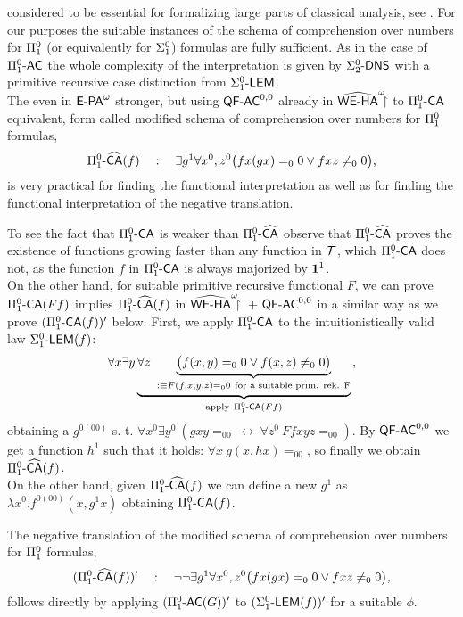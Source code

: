 considered to be essential for formalizing large
parts of classical analysis, see \cite{Simpson99}. 
For our purposes the suitable instances of the schema of comprehension over
numbers for $\Pi^0_1$ (or equivalently for $\Sigma^0_1$) formulas are fully sufficient.
As in the case of $\Pi^0_1\textsf{\upshape -}\textsf{\upshape AC}$ the whole complexity
of the interpretation is given by $\Sigma^0_2\textsf{\upshape -}\textsf{\upshape DNS}$ with a primitive recursive case distinction
from $\Sigma^0_1\textsf{\upshape -LEM}$.\\
The even in ${\textsf{\upshape E-PA}}^\omega$ stronger, but using $\textsf{\upshape QF}\textsf{\upshape -}\textsf{\upshape AC}^{0,0}$ already in $\widehat{\textsf{\upshape WE-HA}}^\omega\!\!\!\restriction$ to $\Pi^0_1\textsf{\upshape -}\textsf{\upshape CA}$ equivalent, form called 
modified schema of comprehension over numbers for $\Pi^0_1$ formulas,
\[
\Pi^0_1\textsf{\upshape -}\widehat{\textsf{\upshape CA}}(f)\quad:\quad\exists g^1 \forall x^0,z^0 \big(fx(gx)=_00 \vee fxz\neq_00\big)\text{,}
\]
is very practical for finding the functional interpretation as well as for finding
the functional interpretation of the negative translation.
\begin{rmk}
To see the fact that $\Pi^0_1\textsf{\upshape -}\textsf{\upshape CA}$ is weaker than $\Pi^0_1\textsf{\upshape -}\widehat{\textsf{\upshape CA}}$ observe that
$\Pi^0_1\textsf{\upshape -}\widehat{\textsf{\upshape CA}}$ proves the existence of functions growing faster than any function in $\mathcal{T}$, which
$\Pi^0_1\textsf{\upshape -}\textsf{\upshape CA}$ does not, as the function $f$ in $\Pi^0_1\textsf{\upshape -}\textsf{\upshape CA}$ is always majorized by $\mathbf1^1$.\\
On the other hand, for suitable primitive recursive functional $F$, we can prove $\Pi^0_1\textsf{\upshape -}\textsf{\upshape CA}(Ff)$ implies $\Pi^0_1\textsf{\upshape -}\widehat{\textsf{\upshape CA}}(f)$ in $\widehat{\textsf{\upshape WE-HA}}^\omega\!\!\!\restriction\ +\ \textsf{\upshape QF}\textsf{\upshape -}\textsf{\upshape AC}^{0,0}$
in a similar way as we prove $(\Pi^0_1\textsf{\upshape -}\textsf{\upshape CA}(f))'$ below.
First, we apply $\Pi^0_1\textsf{\upshape -}\textsf{\upshape CA}$ to the intuitionistically valid law $\Sigma^0_1\textsf{\upshape -LEM}(f)$:
\[
\forall x\exists y \underbrace{
                        \forall z\  \underbrace {\big(f(x,y)=_00 \vee f(x,z)\neq_00\big)}_{
                                                                                :\equiv F(f,x,y,z)=_00\ \text{for a suitable prim. rek. F} } }_{
                                                        \text{apply}\ \PiLm\CA(Ff) }
\text{,}
\]
obtaining a $g^{0(00)}$ s. t. $\forall x^0\exists y^0\ (gxy=_00\ \leftrightarrow\ \forall z^0\ Ffxyz=_00)$.
By $\textsf{\upshape QF}\textsf{\upshape -}\textsf{\upshape AC}^{0,0}$ we get a function $h^1$ such that it holds: $\forall x\ g(x,hx)=_00$, so finally we obtain $\Pi^0_1\textsf{\upshape -}\widehat{\textsf{\upshape CA}}(f)$.\\
On the other hand, given $\Pi^0_1\textsf{\upshape -}\widehat{\textsf{\upshape CA}}(f)$ we can define a new $g^1$ as $\lambda x^0.f^{0(00)}(x,g^1x)$ obtaining $\Pi^0_1\textsf{\upshape -}\textsf{\upshape CA}(f)$.
\end{rmk}
The negative translation of the modified schema of comprehension 
over numbers for $\Pi^0_1$ formulas,
\[
(\Pi^0_1\textsf{\upshape -}\widehat{\textsf{\upshape CA}}(f))'\quad:\quad
 \neg\neg \exists g^1 \forall x^0,z^0 \big(fx(gx)=_00 \vee fxz\neq_00\big)\text{,}
\]
follows directly by applying $(\Pi^0_1\textsf{\upshape -}\textsf{\upshape AC}(G))'$ to $(\Sigma^0_1\textsf{\upshape -LEM}(f))'$ for a suitable $\phi$.\\
